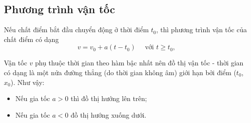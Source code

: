 \subsection {Phương trình vận tốc}
Nếu chất điểm bắt đầu chuyển động ở thời điểm $t_0$, thì phương trình vận tốc của chất điểm có dạng 
\begin{equation*}
	v=v_0+a(t-t_0)\quad \textrm{ với }t\geq t_0,
\end{equation*}

Vận tốc $v$ phụ thuộc thời gian theo hàm bậc nhất nên đồ thị vận tốc - thời gian có dạng là một nửa đường thẳng (do thời gian không âm) giới hạn bởi điểm ($t_0$, $x_0$). Như vậy:
\begin{itemize}
	\item Nếu gia tốc $a>0$ thì đồ thị hướng lên trên;
	\item Nếu gia tốc $a<0$ đồ thị hướng xuống dưới.
\end{itemize}

